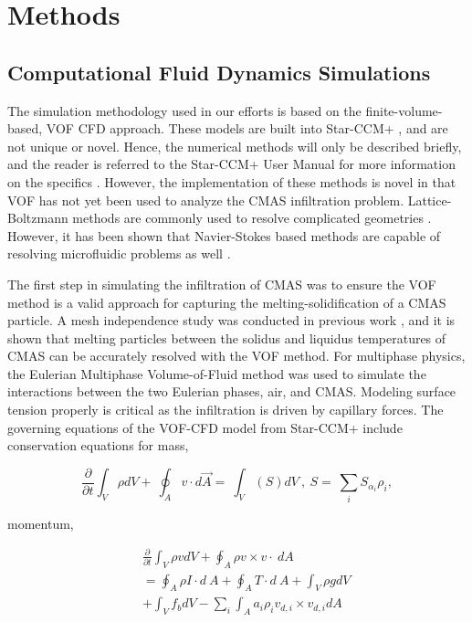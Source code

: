 \documentclass[%
 aip,
 amsmath,amssymb,
 reprint,%
floatfix]{revtex4-1}
\begin{document}
\section{Methods}
\label{sec:methods}

\subsection{Computational Fluid Dynamics Simulations}
The simulation methodology used in our efforts\cite{Cavainolo2023, Cavainolo2022} is based on the finite-volume-based, VOF CFD approach. These models are built into Star-CCM+ \cite{starccm}, and are not unique or novel. Hence, the numerical methods will only be described briefly, and the reader is referred to the Star-CCM+ User Manual for more information on the specifics \cite{starccm}. However, the implementation of these methods is novel in that VOF has not yet been used to analyze the CMAS infiltration problem. Lattice-Boltzmann methods are commonly used to resolve complicated geometries \cite{Zhang2011}. However, it has been shown that Navier-Stokes based methods are capable of resolving microfluidic problems as well \cite{LeHenaff2022}.

The first step in simulating the infiltration of CMAS was to ensure the VOF method is a valid approach for capturing the melting-solidification of a CMAS particle. A mesh independence study was conducted in previous work \cite{Cavainolo2022}, and it is shown that melting particles between the solidus and liquidus temperatures of CMAS can be accurately resolved with the VOF method. For multiphase physics, the Eulerian Multiphase Volume-of-Fluid method was used to simulate the interactions between the two Eulerian phases, air, and CMAS.  Modeling surface tension properly is critical as the infiltration is driven by capillary forces. The governing equations of the VOF-CFD model from  Star-CCM+ \cite{starccm} include conservation equations for mass,

\begin{equation}
\label{consMass:equation}
    \frac{\partial}{\partial t}\int_{V}\rho dV+\ \oint_{A}{v\cdot d\Vec{A}}=\ \int_{V}\left(S\right)dV\ ,\ S=\ \sum_{i}{S_{\alpha_i}\rho_i},
\end{equation}

\noindent momentum,

\begin{eqnarray}
\label{consMomentum:equation}
    &&\frac{\partial}{\partial t}\int_{V}\rho vdV+\oint_{A}{\rho v\times v}\cdot\ dA \nonumber\\
    &&=\oint_{A}{\rho I\cdot d\ A}+\oint_{A}{T\cdot d\ A}+\int_{V}\rho gdV\ \\
    &&+\int_{V}{f_bdV}-\sum_{i}\int_{A}{a_i\rho_iv_{d,i}\times v_{d,i}dA}\nonumber
\end{eqnarray}
\end{document}
